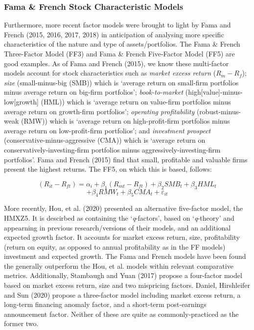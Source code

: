 \documentclass[11pt, english]{article}
\begin{document}
		\subsubsection*{Fama \& French Stock Characteristic Models}

	Furthermore, more recent factor models were brought to light by Fama and French (2015, 2016, 2017, 2018) in anticipation of analysing more specific characteristics of the nature and type of assets/portfolios. The Fama \& French Three-Factor Model (FF3) and Fama \& French Five-Factor Model (FF5) are good examples. As of Fama and French (2015), we know these multi-factor models account for stock characteristics such as \textit{market excess return} ($R_m-R_f$); \textit{size} (small-minus-big (SMB)) which is `average return on small-firm portfolios minus average return on big-firm portfolios'; \textit{book-to-market} (high[value]-minus-low[growth] (HML)) which is `average return on value-firm portfolios minus average return on growth-firm portfolios'; \textit{operating profitability} (robust-minus-weak (RMW)) which is `average return on high-profit-firm portfolios minus average return on low-profit-firm portfolios'; and \textit{investment prospect} (conservative-minus-aggressive (CMA)) which is `average return on conservatively-investing-firm portfolios minus aggressively-investing-firm portfolios'. Fama and French (2015) find that small, profitable and valuable firms present the highest returns. The FF5, on which this is based, follows:

	$$(R_{it}-R_{ft})=\alpha_i+\beta_1(R_{mt}-R_{ft})+\beta_2SMB_t+\beta_3HML_t$$
	$$+\beta_4RMW_t+\beta_5CMA_t+\varepsilon_{it}$$


	More recently, Hou, et al. (2020) presented an alternative five-factor model, the HMXZ5. It is descirbed as containing the `\textit{q}-factors', based on `\textit{q}-theory' and appearning in previous research/versions of their models, and an additional expected growth factor. It accounts for market excess return, size, profitability (return on equity, as opposed to annual profitability as in the FF models) investment and expected growth. The Fama and French models have been found the generally outperform the Hou, et al. models within relevant comparative metrics. Additionally, Stambaugh and Yuan (2017) propose a four-factor model based on market excess return, size and two mispricing factors. Daniel, Hirshleifer and Sun (2020) propose a three-factor model including market excess return, a long-term financing anomaly factor, and a short-term post-earnings announcement factor. Neither of these are quite as commonly-practiced as the former two. 
\end{document}
